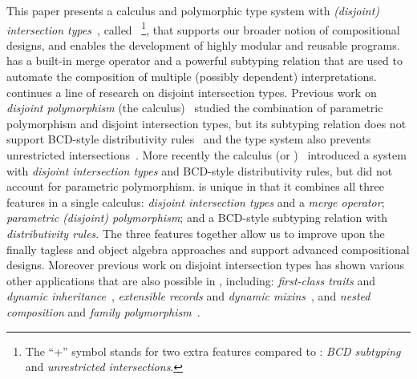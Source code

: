 This paper presents a calculus and polymorphic type system with
\emph{(disjoint) intersection types}~\cite{oliveira2016disjoint},
called \fnamee~\footnote{The ``+'' symbol stands for two extra features
compared to \fname: \emph{BCD subtyping} and \emph{unrestricted intersections}.}, that
supports our broader notion of compositional designs, and enables
the development of highly modular and reusable programs. \fnamee
has a built-in merge operator and a powerful subtyping relation that
are used to automate the composition of multiple (possibly dependent) interpretations.
\fnamee continues a line of
research on disjoint intersection types.
 Previous work on
\emph{disjoint polymorphism} (the \fname calculus)~\cite{alpuimdisjoint} studied the
combination of parametric polymorphism and disjoint intersection
types, but its subtyping relation does not support
BCD-style distributivity rules~\cite{Barendregt_1983} and the type system
also prevents unrestricted intersections~\cite{dunfield2014elaborating}. More recently the \name
calculus (or \namee)~\cite{bi_et_al:LIPIcs:2018:9227} introduced a system with \emph{disjoint
  intersection types} and BCD-style distributivity rules, but did not
account for parametric polymorphism. \fnamee is unique in that it
combines all three features in a single calculus:
\emph{disjoint intersection types} and a \emph{merge operator};
\emph{parametric (disjoint) polymorphism}; and a BCD-style subtyping
relation with \emph{distributivity rules}. The three features together
allow us to improve upon the finally tagless and object
algebra approaches and support advanced compositional designs.
Moreover previous work on disjoint intersection types has shown 
various other applications that are also possible in \fnamee, including: \emph{first-class
  traits} and \emph{dynamic inheritance}~\cite{bi_et_al:LIPIcs:2018:9214}, \emph{extensible records} and \emph{dynamic
  mixins}~\cite{alpuimdisjoint}, and \emph{nested composition} and \emph{family polymorphism}~\cite{bi_et_al:LIPIcs:2018:9227}. 


